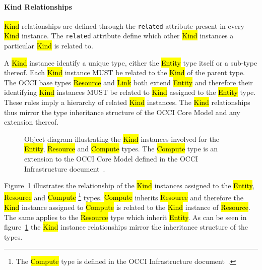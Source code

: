 \documentclass[10pt,a4paper]{article}
\begin{document}
\paragraph*{Kind Relationships}
\hl{Kind} relationships are defined through the {\tt related} attribute present
in every \hl{Kind} instance. The {\tt related} attribute define which other
\hl{Kind} instances a particular \hl{Kind} is related to.

A \hl{Kind} instance identify a unique type, either the \hl{Entity} type itself
or a sub-type thereof.  Each \hl{Kind} instance MUST be related to the
\hl{Kind} of the parent type.
%
The OCCI base types \hl{Resource} and \hl{Link} both extend \hl{Entity} and
therefore their identifying \hl{Kind} instances MUST be related to \hl{Kind}
assigned to the \hl{Entity} type.
%
These rules imply a hierarchy of related \hl{Kind} instances. The \hl{Kind}
relationships thus mirror the type inheritance structure of the OCCI Core
Model and any extension thereof.

\begin{figure}[!h]
{\centering {} \par}
  \caption{Object diagram illustrating the \hl{Kind} instances involved for the
  \hl{Entity}, \hl{Resource} and \hl{Compute} types. The \hl{Compute} type is an
  extension to the OCCI Core Model defined in the OCCI Infrastructure
  document~\cite{occi:infrastructure}.}
  \label{fig:kind_relationships}
\end{figure}

Figure~\ref{fig:kind_relationships} illustrates the relationship of the \hl{Kind}
instances assigned to the \hl{Entity}, \hl{Resource} and \hl{Compute}%
\footnote{The \hl{Compute} type is defined in the OCCI Infrastructure
 document~\cite{occi:infrastructure}.}
types.
%
\hl{Compute} inherits \hl{Resource} and therefore the \hl{Kind} instance
assigned to \hl{Compute} is related to the \hl{Kind} instance of \hl{Resource}.
The same applies to the \hl{Resource} type which inherit \hl{Entity}.
%
As can be seen in figure~\ref{fig:kind_relationships} the \hl{Kind} instance
relationships mirror the inheritance structure of the types.
\end{document}
